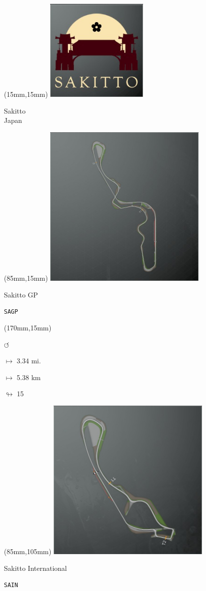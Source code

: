 \begin{textblock*}{60mm}(15mm,15mm)%
\includegraphics[width=50mm]{LG/2015-05-20_00093.png}
\par Sakitto\\ Japan
\end{textblock*}
\begin{textblock*}{80mm}(85mm,15mm)%
\includegraphics[width=80mm]{TR/2015-05-20_00052.png}
\centerline{Sakitto GP}
\par\hfill\tiny\tt SAGP\\
\end{textblock*}
\begin{textblock*}{30mm}(170mm,15mm)%
\par \Huge$\circlearrowleft$
\Large
\par$\mapsto$ 3.34 mi.
\par$\mapsto$ 5.38 km
\par$\looparrowright$ 15
\end{textblock*}
\begin{textblock*}{80mm}(85mm,105mm)%
\includegraphics[width=80mm]{TR/2015-05-20_00055.png}
\centerline{Sakitto International}
\par\hfill\tiny\tt SAIN\\
\end{textblock*}
